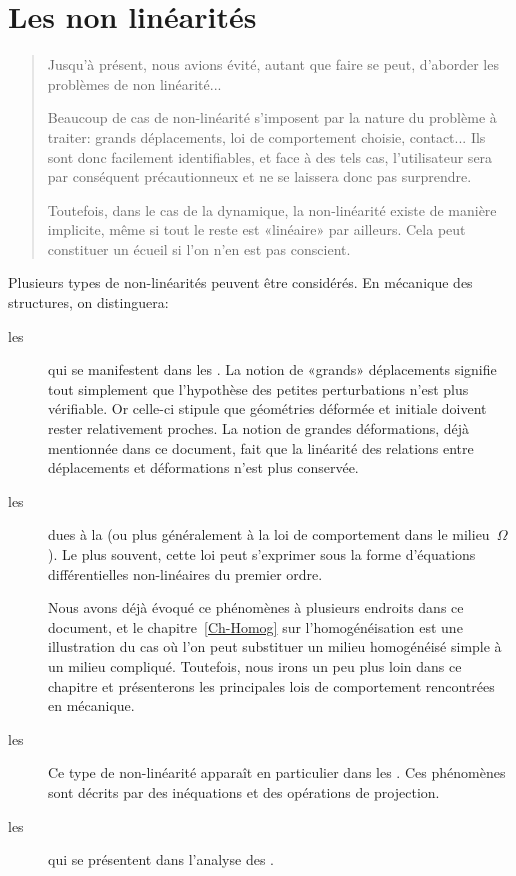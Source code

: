 \chapter{Les non linéarités}\label{Ch-NL}
\begin{abstract}
Jusqu'à présent, nous avions évité, autant que faire se peut, d'aborder les problèmes de non linéarité...

\medskip
Beaucoup de cas de non-linéarité s'imposent par la nature du problème à traiter: grands déplacements, loi de comportement choisie, contact... Ils sont donc facilement identifiables, et face à des tels cas, l'utilisateur sera par conséquent précautionneux et ne se laissera donc pas surprendre.

Toutefois, dans le cas de la dynamique, la non-linéarité existe de manière implicite, même si tout le reste est «linéaire» par ailleurs. Cela peut constituer un écueil si l'on n'en est pas conscient.
\end{abstract}

\noindent Plusieurs types de non-linéarités peuvent être considérés. En mécanique des structures, on distinguera:
\begin{description}
   \item[les ] qui se manifestent dans les
	. La notion de «grands» déplacements signifie tout simplement que l'hypothèse des petites perturbations n'est plus vérifiable. Or celle-ci stipule que géométries déformée et initiale doivent rester relativement proches.
	La notion de grandes déformations, déjà mentionnée dans ce document, fait que la linéarité des relations entre déplacements et déformations n'est plus conservée.
\item[les ] dues à la  (ou plus généralement à la loi de comportement dans le milieu~$\Omega$).
	Le plus souvent, cette loi peut s'exprimer sous la forme d'équations différentielles non-linéaires du premier ordre.

	Nous avons déjà évoqué ce phénomènes à plusieurs endroits dans ce document, et le chapitre~\ref{Ch-Homog} sur l'homogénéisation est une illustration du cas où l'on peut 	substituer un milieu homogénéisé simple à un milieu compliqué. Toutefois, nous irons un peu plus loin dans ce chapitre et présenterons les principales lois de comportement 	rencontrées en mécanique.

  \item[les ]
	Ce type de non-linéarité apparaît en particulier dans les . Ces phénomènes sont décrits par des inéquations et des opérations de projection.

  \item[les ] qui se présentent dans l'analyse des .
\end{description}




